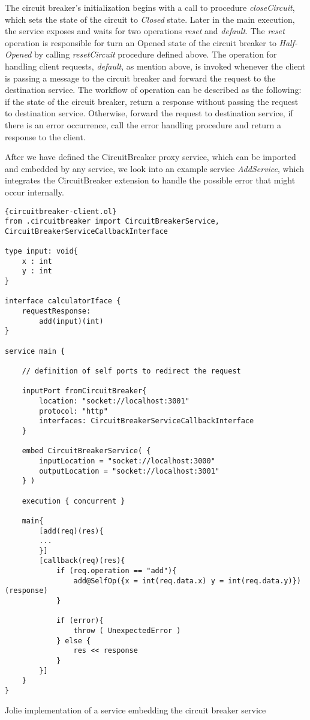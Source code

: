 The circuit breaker's initialization begins with a call to procedure \textit{closeCircuit}, which sets the state of the circuit to \textit{Closed} state. Later in the main execution, the service exposes and waits for two operations \textit{reset} and \textit{default}. The \textit{reset} operation is responsible for turn an Opened state of the circuit breaker to \textit{Half-Opened} by calling \textit{resetCircuit} procedure defined above. The operation for handling client requests, \textit{default}, as mention above, is invoked whenever the client is passing a message to the circuit breaker and forward the request to the destination service. The workflow of operation can be described as the following:
if the state of the circuit breaker, return a response without passing the request to destination service.
Otherwise, forward the request to destination service, if there is an error occurrence, call the error handling procedure and return a response to the client.

After we have defined the CircuitBreaker proxy service, which can be imported and embedded by any service, we look into an example service \textit{AddService}, which integrates the CircuitBreaker extension to handle the possible error that might occur internally.

\begin{listing}[]
    \lstset{language=Jolie,
        style=codeStyle,
        basicstyle=\ttfamily\footnotesize
        }
    \begin{lstlisting}[frame=tlrb]{circuitbreaker-client.ol}
from .circuitbreaker import CircuitBreakerService, CircuitBreakerServiceCallbackInterface

type input: void{
    x : int
    y : int
}

interface calculatorIface {
    requestResponse: 
        add(input)(int)
}

service main {
    
    // definition of self ports to redirect the request

    inputPort fromCircuitBreaker{
        location: "socket://localhost:3001"
        protocol: "http"
        interfaces: CircuitBreakerServiceCallbackInterface
    }

    embed CircuitBreakerService( { 
        inputLocation = "socket://localhost:3000"
        outputLocation = "socket://localhost:3001" 
    } )

    execution { concurrent }

    main{
        [add(req)(res){
		...
        }]
        [callback(req)(res){
            if (req.operation == "add"){
                add@SelfOp({x = int(req.data.x) y = int(req.data.y)})(response)               
            }       

		    if (error){
	    		throw ( UnexpectedError )
		    } else {
                res << response
         	}                  
        }]
    }
}
\end{lstlisting}
\caption{Jolie implementation of a service embedding the circuit breaker service}
\label{circuitbreaker-client.ol}
\end{listing}

